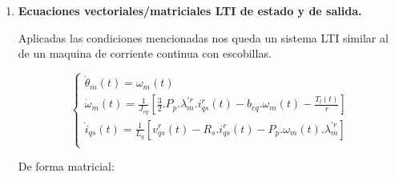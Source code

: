 \documentclass{article}
\begin{document}
\begin{enumerate}[label=\roman*.]
    \item \textbf{Ecuaciones vectoriales/matriciales LTI de estado y de salida.} 
    
    Aplicadas las condiciones mencionadas nos queda un sistema LTI similar al de un maquina 
    de corriente continua con escobillas.

    \begin{equation}\label{eq.lti}
        \begin{cases}
            \dot{\theta}_{m}(t) = \omega_{m}(t)\\
            \dot{\omega}_{m}(t) = \frac{1}{J_{eq}}[\frac{3}{2}.P_{p}.\lambda_{m}^{\prime r}.i_{qs}^r(t) - b_{eq}.\omega_{m}(t) - \frac{T_{l}(t)}{r}]\\
            \dot{i}_{qs}(t) = \frac{1}{L_{q}}[v_{qs}^r(t) - R_{s}.i_{qs}^r(t) - P_{p}.\omega_{m}(t).\lambda_{m}^{\prime r}]  \\
        \end{cases}
    \end{equation}

    De forma matricial:


\end{enumerate}
\end{document}
